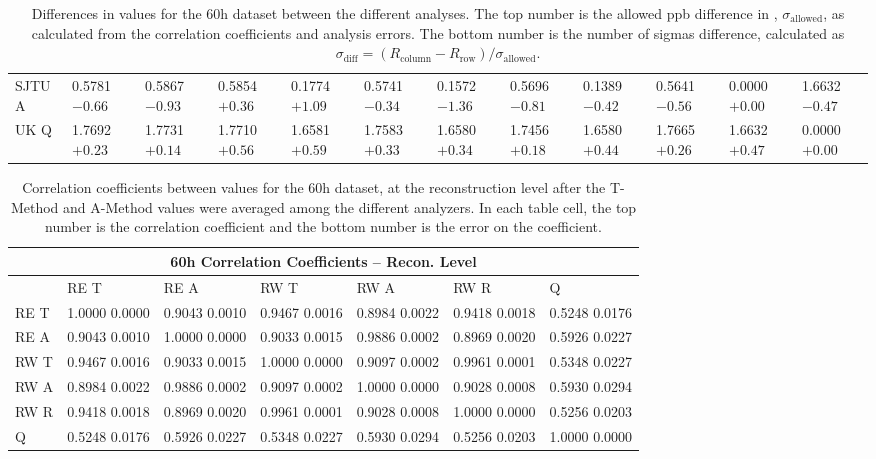 \begin{landscape}
\begin{table}
\begin{tabularx}{1\linewidth}{@{\extracolsep{\fill}}lXXXXXXXXXXX}
	SJTU A & 0.5781 $-0.66$ & 0.5867 $-0.93$ & 0.5854 $+0.36$ & 0.1774 $+1.09$ & 0.5741 $-0.34$ & 0.1572 $-1.36$ & 0.5696 $-0.81$ & 0.1389 $-0.42$ & 0.5641 $-0.56$ & 0.0000 $+0.00$ & 1.6632 $-0.47$  \\
	UK Q   & 1.7692 $+0.23$ & 1.7731 $+0.14$ & 1.7710 $+0.56$ & 1.6581 $+0.59$ & 1.7583 $+0.33$ & 1.6580 $+0.34$ & 1.7456 $+0.18$ & 1.6580 $+0.44$ & 1.7665 $+0.26$ & 1.6632 $+0.47$ & 0.0000 $+0.00$  \\
  \bottomrule
\end{tabularx}
\caption[]{Differences in \R values for the 60h dataset between the different analyses. The top number is the allowed ppb difference in \R, $\sigma_{\text{allowed}}$, as calculated from the correlation coefficients and analysis errors. The bottom number is the number of sigmas difference, calculated as $\sigma_{\text{diff}} = (R_{\text{column}}-R_{\text{row}})/\sigma_{\text{allowed}}$.}
\label{tab:60h_diff}
\end{table}
\end{landscape}


\begin{table}
\setlength\tabcolsep{15pt}
\small
\centering
\renewcommand{\arraystretch}{1.4}
\begin{tabularx}{0.8\linewidth}{@{\extracolsep{\fill}}lXXXXXX}
  \toprule
  	\multicolumn{7}{c}{{\normalsize 60h Correlation Coefficients -- Recon. Level}} \\
  \midrule
  	       & RE T & RE A & RW T & RW A & RW R & \quad Q \\
  \midrule
	RE T   & 1.0000 0.0000 & 0.9043 0.0010 & 0.9467 0.0016 & 0.8984 0.0022 & 0.9418 0.0018 & 0.5248 0.0176  \\
	RE A   & 0.9043 0.0010 & 1.0000 0.0000 & 0.9033 0.0015 & 0.9886 0.0002 & 0.8969 0.0020 & 0.5926 0.0227  \\
	RW T   & 0.9467 0.0016 & 0.9033 0.0015 & 1.0000 0.0000 & 0.9097 0.0002 & 0.9961 0.0001 & 0.5348 0.0227  \\
	RW A   & 0.8984 0.0022 & 0.9886 0.0002 & 0.9097 0.0002 & 1.0000 0.0000 & 0.9028 0.0008 & 0.5930 0.0294  \\
	RW R   & 0.9418 0.0018 & 0.8969 0.0020 & 0.9961 0.0001 & 0.9028 0.0008 & 1.0000 0.0000 & 0.5256 0.0203  \\
	Q      & 0.5248 0.0176 & 0.5926 0.0227 & 0.5348 0.0227 & 0.5930 0.0294 & 0.5256 0.0203 & 1.0000 0.0000  \\
  \bottomrule
\end{tabularx}
\caption[]{Correlation coefficients between \R values for the 60h dataset, at the reconstruction level after the \RW T-Method and A-Method \R values were averaged among the different analyzers. In each table cell, the top number is the correlation coefficient and the bottom number is the error on the coefficient.}
\label{tab:Corrs_60h_recon}
\end{table}







